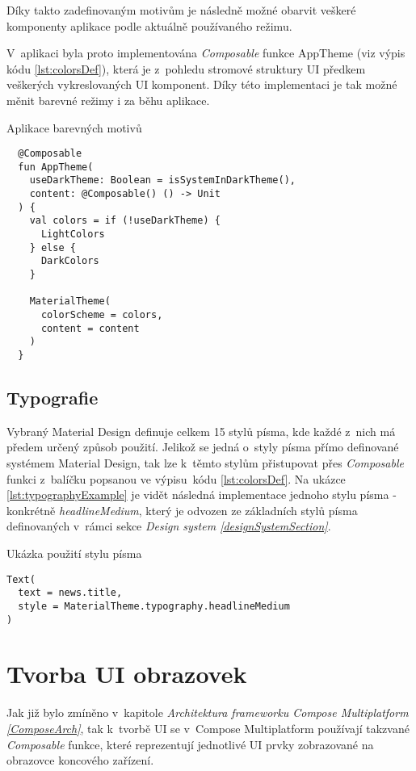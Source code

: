 Díky takto zadefinovaným motivům je následně možné obarvit veškeré komponenty aplikace podle aktuálně používaného režimu.

V~aplikaci byla proto implementována \textit{Composable} funkce AppTheme (viz výpis kódu \ref{lst:colorsDef}), která je z~pohledu stromové struktury
UI předkem veškerých vykreslovaných UI komponent. Díky této implementaci je tak možné měnit barevné režimy i za běhu aplikace. 
\begin{listing}[H]
\caption{Aplikace barevných motivů}\label{lst:colorsDef}
\begin{verbatim}
  @Composable
  fun AppTheme(
    useDarkTheme: Boolean = isSystemInDarkTheme(),
    content: @Composable() () -> Unit
  ) {
    val colors = if (!useDarkTheme) {
      LightColors
    } else {
      DarkColors
    }
  
    MaterialTheme(
      colorScheme = colors,
      content = content
    )
  }
\end{verbatim}
\end{listing}

\begin{sloppypar}
\subsection*{Typografie}
Vybraný Material Design definuje celkem 15 stylů písma, kde každé z~nich má předem určený způsob použití. \cite{material3} 
Jelikož se jedná o~styly písma přímo definované systémem Material Design, tak lze k~těmto stylům přistupovat přes
\textit{Composable} funkci  z~balíčku  popsanou ve výpisu~kódu \ref{lst:colorsDef}.
Na ukázce \ref{lst:typographyExample} je vidět následná implementace jednoho stylu písma - konkrétně \textit{headlineMedium}, který je odvozen ze základních stylů písma 
definovaných v~rámci sekce \textit{Design system \ref{designSystemSection}}.
\end{sloppypar}
\begin{listing}[H]
\caption{Ukázka použití stylu písma}\label{lst:typographyExample}
\begin{verbatim}
Text(
  text = news.title,
  style = MaterialTheme.typography.headlineMedium
)
\end{verbatim}
\end{listing}

\section{Tvorba UI obrazovek}
Jak již bylo zmíněno v~kapitole \textit{Architektura frameworku Compose Multiplatform \ref{ComposeArch}}, tak k~tvorbě UI se v~Compose Multiplatform 
používají takzvané \textit{Composable} funkce, které reprezentují jednotlivé UI prvky zobrazované na obrazovce koncového zařízení. 

